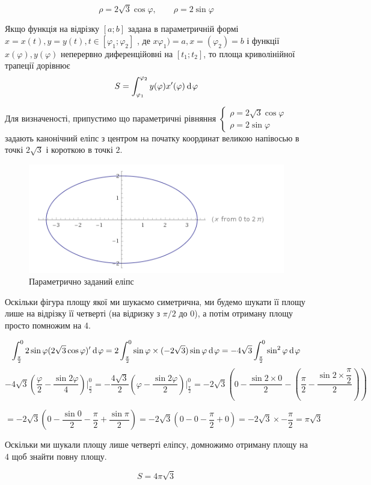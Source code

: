 {}

$$
  \rho=2\sqrt{3}\cos\varphi,{\qquad} \rho=2\sin\varphi
$$

Якщо функція на відрізку  $[a; b]$  задана в параметричній формі
$x=x(t), y=y(t) , t \in [\varphi_1;\varphi_2]$ , де $x\varphi_1)=a, x=(\varphi_2)=b$ і функції $x(\varphi), y(\varphi)$
неперервно диференційовні на  $[t_1;t_2]$, то площа криволінійної трапеції дорівнює
$$S=\int^{\varphi_2}_{\varphi_1} y(\varphi)x'(\varphi) \hspace{2pt}\text{d}\hspace{1pt}{\varphi}$$

Для визначеності, припустимо що параметричні рівняння $\begin{cases} \rho=2\sqrt{3}\cos\varphi \\ \rho=2\sin\varphi \end{cases}$ задають канонічний еліпс з центром на початку координат великою напівосью в точкі $2\sqrt{3}$ і короткою в точкі $2$.

\begin{figure}[h!]
  \centering
  \includegraphics[width=14cm]{rozrahunkova_02/04_02.png}
  \caption{Параметрично заданий еліпс}
  \label{fig:rr_01_40_02}
  \centering
\end{figure}

Оскільки фігура площу якої ми шукаємо симетрична, ми будемо шукати її площу лише на відрізку її четверті (на відризку з $\pi/2$ до 0), а потім отриману площу просто помножим на 4.

$$
  \int^0_{\frac{\pi}{2}} 2 \sin{\varphi} (2\sqrt{3}\cos\varphi)' \hspace{2pt}\text{d}\hspace{1pt}{\varphi}
= 2 \int^0_{\frac{\pi}{2}} \sin{\varphi} \times (- 2\sqrt{3} ) \sin{\varphi} \hspace{2pt}\text{d}\hspace{1pt}{\varphi}
= -4\sqrt{3} \int^0_{\frac{\pi}{2}} \sin^2{\varphi} \hspace{2pt}\text{d}\hspace{1pt}{\varphi}
$$
$$
  -4\sqrt{3} ( \dfrac{\varphi}{2} - \dfrac{\sin{2\varphi}}{4} ) \Bigg|^0_{\frac{\pi}{2}}
= -\dfrac{4\sqrt{3}}{2} ( \varphi - \dfrac{\sin{2\varphi}}{2} ) \Bigg|^0_{\frac{\pi}{2}}
= -2\sqrt{3} ( 0 - \dfrac{\sin{2 \times 0}}{2} - ( \dfrac{\pi}{2} - \dfrac{\sin{2 \times \dfrac{\pi}{2} }}{2} ) )
$$

$$
= -2\sqrt{3} ( 0 - \dfrac{\sin{0}}{2} -   \dfrac{\pi}{2} + \dfrac{\sin{\pi}}{2} )
= -2\sqrt{3} ( 0 - 0 - \dfrac{\pi}{2} + 0 )  =  -2\sqrt{3} \times -\dfrac{\pi}{2}
= \boxed{\pi\sqrt{3}}
$$

Оскільки ми шукали площу лише четверті еліпсу, домножимо отриману площу на 4 щоб знайти повну площу.

$$
  \boxed{S = 4\pi\sqrt{3}}
$$

%
%
